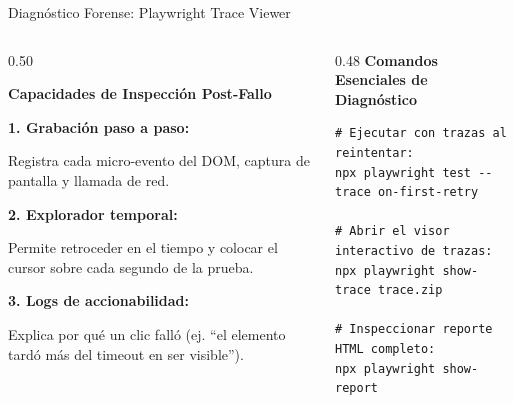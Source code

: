 \documentclass[aspectratio=169]{beamer}
\begin{document}
\begin{frame}[fragile]{Diagnóstico Forense: Playwright Trace Viewer}
  \begin{columns}[T,onlytextwidth]
    \begin{column}{0.50\textwidth}
      \begin{tcolorbox}[colback=cbWhite,colframe=cbBorder,arc=4pt,top=5pt,bottom=5pt,left=5pt,right=5pt]
        {\footnotesize\bfseries\color{cbBlue} Capacidades de Inspección Post-Fallo}\par
        \vspace{0.1cm}
        {\scriptsize
        \textbf{1. Grabación paso a paso:}\par
        Registra cada micro-evento del DOM, captura de pantalla y llamada de red.\par\vspace{0.1cm}
        \textbf{2. Explorador temporal:}\par
        Permite retroceder en el tiempo y colocar el cursor sobre cada segundo de la prueba.\par\vspace{0.1cm}
        \textbf{3. Logs de accionabilidad:}\par
        Explica por qué un clic falló (ej. ``el elemento tardó más del timeout en ser visible'').\par
        }
      \end{tcolorbox}
    \end{column}
    \begin{column}{0.48\textwidth}
      \textbf{\scriptsize\color{cbDark} Comandos Esenciales de Diagnóstico}
      \begin{lstlisting}[style=bashlst]
# Ejecutar con trazas al reintentar:
npx playwright test --trace on-first-retry

# Abrir el visor interactivo de trazas:
npx playwright show-trace trace.zip

# Inspeccionar reporte HTML completo:
npx playwright show-report
      \end{lstlisting}
    \end{column}
  \end{columns}
\end{frame}
\end{document}
